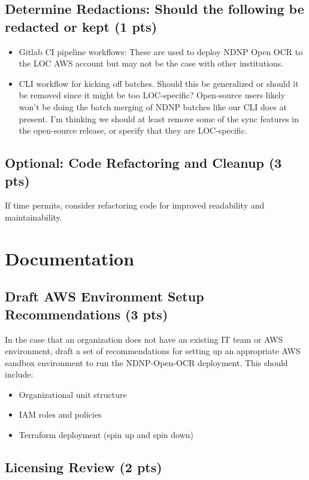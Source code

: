 \documentclass{article}
\begin{document}
\subsection{Determine Redactions: Should the following be redacted or kept (1 pts)}
\begin{itemize}[label=$\square$]
    
    \item Gitlab CI pipeline workflows: These are used to deploy NDNP Open OCR to the LOC AWS account but may not be the case with other institutions.
    \item CLI workflow for kicking off batches. Should this be generalized or should it be removed since it might be too LOC-specific? Open-source users likely won't be doing the batch merging of NDNP batches like our CLI does at present. I'm thinking we should at least remove some of the sync features in the open-source release, or specify that they are LOC-specific.
\end{itemize}
\subsection{Optional: Code Refactoring and Cleanup (3 pts)}
If time permits, consider refactoring code for improved readability and maintainability. 



\section {Documentation}

\subsection{Draft AWS Environment Setup Recommendations (3 pts)}
In the case that an organization does not have an existing IT team or AWS environment, draft a set of recommendations for setting up an appropriate AWS sandbox environment to run the NDNP-Open-OCR deployment. This should include:
\begin{itemize}[label=$\square$]
    \item Organizational unit structure
    \item IAM roles and policies
    \item Terraform deployment (spin up and spin down)
\end{itemize}


\subsection{Licensing Review (2 pts)}
\end{document}
